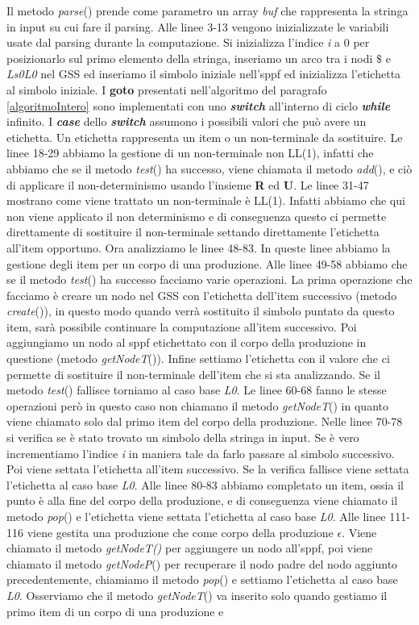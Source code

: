 Il metodo \textit{parse}() prende come parametro un array \textit{buf} che rappresenta la stringa in input su cui fare il parsing. Alle linee 3-13 vengono inizializzate le variabili usate dal parsing durante la computazione. Si inizializza l'indice \textit{i} a 0 per posizionarlo sul primo elemento della stringa, inseriamo un arco tra i nodi $\$$ e \textit{Ls0L0} nel GSS ed inseriamo il simbolo iniziale nell'sppf ed inizializza l'etichetta al simbolo iniziale. I \textbf{goto} presentati nell'algoritmo del paragrafo \ref{algoritmoIntero} sono implementati con uno \textbf{\textit{switch }}all'interno di ciclo \textbf{\textit{while}} infinito. I \textbf{\textit{case}} dello \textbf{\textit{switch}} assumono i possibili valori che può avere un etichetta. Un etichetta rappresenta un item o un non-terminale da sostituire. Le linee 18-29 abbiamo la gestione di un non-terminale non LL(1), infatti che abbiamo che se il metodo \textit{test}() ha successo, viene chiamata il metodo \textit{add}(), e ciò di applicare il non-determinismo usando l'insieme \textbf{R} ed \textbf{U}. Le linee 31-47 mostrano come viene trattato un non-terminale è LL(1). Infatti abbiamo che qui non viene applicato il non determinismo e di conseguenza questo ci permette direttamente di sostituire il non-terminale settando direttamente l'etichetta all'item opportuno. Ora analizziamo le linee 48-83. In queste linee abbiamo la gestione degli item per un corpo di una produzione. Alle linee 49-58 abbiamo che se il metodo \textit{test}() ha successo facciamo varie operazioni. La prima operazione che facciamo è creare un nodo nel GSS con l'etichetta dell'item successivo (metodo \textit{create}()), in questo modo quando verrà sostituito il simbolo puntato da questo item, sarà possibile continuare la computazione all'item successivo. Poi aggiungiamo un nodo al sppf etichettato con il corpo della produzione in questione (metodo \textit{getNodeT}()). Infine settiamo l'etichetta con il valore che ci permette di sostituire il non-terminale dell'item che si sta analizzando. Se il metodo \textit{test}() fallisce torniamo al caso base \textit{L0}. Le linee 60-68 fanno le stesse operazioni però in questo caso non chiamano il metodo \textit{getNodeT}() in quanto viene chiamato solo dal primo item del corpo della produzione. Nelle linee 70-78 si verifica se è stato trovato un simbolo della stringa in input. Se è vero incrementiamo l'indice \textit{i} in maniera tale da farlo passare al simbolo successivo. Poi viene settata l'etichetta all'item successivo. Se la verifica fallisce viene settata l'etichetta al caso base \textit{L0}. Alle linee 80-83 abbiamo completato un item, ossia il punto è alla fine del corpo della produzione, e di conseguenza viene chiamato il metodo \textit{pop}() e l'etichetta viene settata l'etichetta al caso base \textit{L0}. Alle linee 111-116 viene gestita una produzione che come corpo della produzione $\epsilon$. Viene chiamato il metodo \textit{getNodeT()} per aggiungere un nodo all'sppf, poi viene chiamato il metodo \textit{getNodeP}() per recuperare il nodo padre del nodo aggiunto precedentemente, chiamiamo il metodo \textit{pop}() e settiamo l'etichetta al caso base \textit{L0}. Osserviamo che il metodo \textit{getNodeT}() va inserito solo quando gestiamo il primo item di un corpo di una produzione e 
